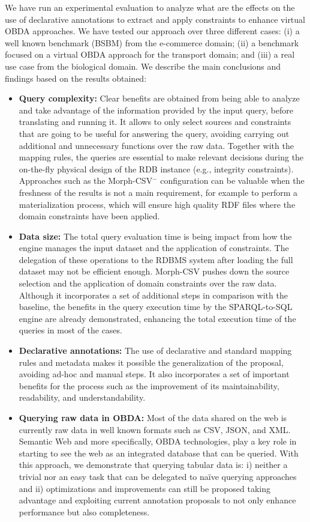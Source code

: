 We have run an experimental evaluation to analyze what are the effects on the use of declarative annotations to extract and apply constraints to enhance virtual OBDA approaches. We have tested our approach over three different cases: (i) a well known benchmark (BSBM) from the e-commerce domain; (ii) a benchmark focused on a virtual OBDA approach for the transport domain; and (iii) a real use case from the biological domain. We describe the main conclusions and findings based on the results obtained:
\begin{itemize}
    \item \textbf{Query complexity:} Clear benefits are obtained from being able to analyze and take advantage of the information provided by the input query, before translating and running it. It allows to only select sources and constraints that are going to be useful for answering the query, avoiding carrying out additional and unnecessary functions over the raw data. Together with the mapping rules, the queries are essential to make relevant decisions during the on-the-fly physical design of the RDB instance (e.g., integrity constraints). Approaches such as the Morph-CSV$^-$ configuration can be valuable when the freshness of the results is not a main requirement, for example to perform a materialization process, which will ensure high quality RDF files where the domain constraints have been applied.
    \item \textbf{Data size:} The total query evaluation time is being impact from how the engine manages the input dataset and the application of constraints. The delegation of these operations to the RDBMS system after loading the full dataset may not be efficient enough. Morph-CSV pushes down the source selection and the application of domain constraints over the raw data. Although it incorporates a set of additional steps in comparison with the baseline, the benefits in the query execution time by the SPARQL-to-SQL engine are already demonstrated, enhancing the total execution time of the queries in most of the cases.
    \item \textbf{Declarative annotations:} The use of declarative and standard mapping rules and metadata makes it possible the generalization of the proposal, avoiding ad-hoc and manual steps. It also incorporates a set of important benefits for the process such as the improvement of its maintainability, readability, and understandability.
    \item \textbf{Querying raw data in OBDA:} Most of the data shared on the web is currently raw data in well known formats such as CSV, JSON, and XML. Semantic Web and more specifically, OBDA technologies, play a key role in starting to see the web as an integrated  database that can be queried. With this approach, we demonstrate that querying tabular data is: i) neither a trivial nor an easy task that can be delegated to na\"ive querying approaches and ii) optimizations and improvements can still be proposed taking advantage and exploiting current annotation proposals to not only enhance performance but also completeness.
\end{itemize}


